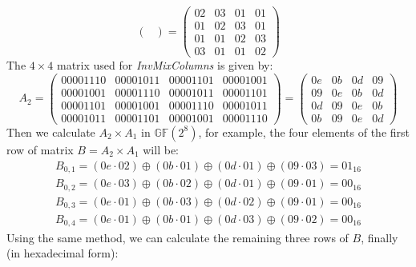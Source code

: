\documentclass[12pt, a4paper]{article}
\begin{document}
\begin{enumerate}
\begin{enumerate}[a)]
$$\begin{pmatrix}
                  \end{pmatrix} = \begin{pmatrix} 02 & 03 & 01 & 01\\ 01 & 02 & 03 & 01\\ 01 & 01 & 02 & 03\\ 03 & 01 & 01 & 02\end{pmatrix}
                  $$
                  The $4\times 4$ matrix used for \emph{InvMixColumns} is given by:
                  $$A_2 = 
                  \begin{pmatrix}
                        00001110 & 00001011 & 00001101 & 00001001\\
                        00001001 & 00001110 & 00001011 & 00001101\\
                        00001101 & 00001001 & 00001110 & 00001011\\
                        00001011 & 00001101 & 00001001 & 00001110
                  \end{pmatrix} = \begin{pmatrix} 0e & 0b & 0d & 09\\ 09 & 0e & 0b & 0d\\ 0d & 09 & 0e & 0b\\ 0b & 09 & 0e & 0d\end{pmatrix}
                  $$
                  Then we calculate $A_2\times A_1$ in $\mathbb{GF}(2^8)$, for example, the four elements of the first row of 
                  matrix $B = A_2 \times A_1$ will be:
                  \begin{equation*}
                        \begin{split}
                              B_{0,1} = (0e\cdot 02) \oplus (0b\cdot 01) \oplus (0d\cdot 01) \oplus (09\cdot 03) = 01_{16}\\
                              B_{0,2} = (0e\cdot 03) \oplus (0b\cdot 02) \oplus (0d\cdot 01) \oplus (09\cdot 01) = 00_{16}\\
                              B_{0,3} = (0e\cdot 01) \oplus (0b\cdot 03) \oplus (0d\cdot 02) \oplus (09\cdot 01) = 00_{16}\\
                              B_{0,4} = (0e\cdot 01) \oplus (0b\cdot 01) \oplus (0d\cdot 03) \oplus (09\cdot 02) = 00_{16}
                        \end{split}
                  \end{equation*}
                  Using the same method, we can calculate the remaining three rows of $B$, finally (in hexadecimal form):

\end{enumerate}
\end{enumerate}
\end{document}
